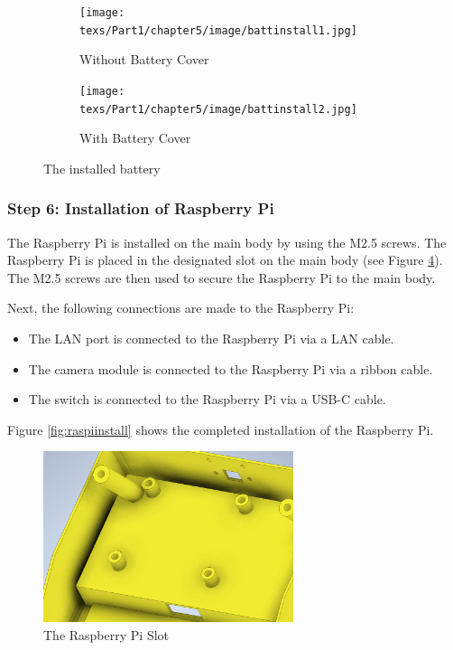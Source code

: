 \begin{figure}[h!]
    \centering
    \begin{subfigure}[c]{0.45\textwidth}
        \begin{minipage}{\textwidth}
            \centering
            \texttt{[image: texs/Part1/chapter5/image/battinstall1.jpg]}
        \end{minipage}
        \caption{Without Battery Cover}
        \label{fig:battery_install_1}
    \end{subfigure}
    \begin{subfigure}[c]{0.45\textwidth}
        \begin{minipage}{\textwidth}
            \centering
            \texttt{[image: texs/Part1/chapter5/image/battinstall2.jpg]}
        \end{minipage}
        \caption{With Battery Cover}
        \label{fig:battery_install_2}
    \end{subfigure}
    \caption{The installed battery}
    \label{fig:batteryinstall}
\end{figure}

\subsubsection{Step 6: Installation of Raspberry Pi}

The Raspberry Pi is installed on the main body by using the M2.5 screws. The Raspberry Pi is placed in the designated slot on the main body (see Figure \ref{fig:raspislot}). The M2.5 screws are then used to secure the Raspberry Pi to the main body.

Next, the following connections are made to the Raspberry Pi:

\begin{itemize}
    \item The LAN port is connected to the Raspberry Pi via a LAN cable.
    \item The camera module is connected to the Raspberry Pi via a ribbon cable.
    \item The switch is connected to the Raspberry Pi via a USB-C cable.
\end{itemize}

Figure \ref{fig:raspiinstall} shows the completed installation of the Raspberry Pi.

\begin{figure}
    \centering
    \includegraphics[height=5cm]{texs/Part1/chapter5/image/raspislot.png}
    \caption{The Raspberry Pi Slot}
    \label{fig:raspislot}
\end{figure}

